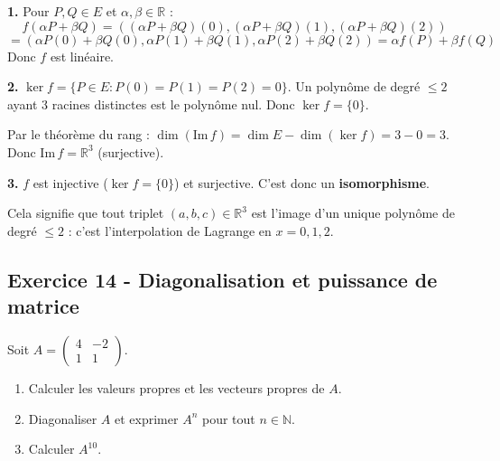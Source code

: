 \documentclass[12pt,a4paper]{article}
\begin{document}
\begin{boitecorrige}
\textbf{1.} Pour $P, Q \in E$ et $\alpha, \beta \in \mathbb{R}$ :
\[
f(\alpha P + \beta Q) = ((\alpha P+\beta Q)(0), (\alpha P+\beta Q)(1), (\alpha P+\beta Q)(2))
\]
\[
= (\alpha P(0)+\beta Q(0), \alpha P(1)+\beta Q(1), \alpha P(2)+\beta Q(2)) = \alpha f(P) + \beta f(Q)
\]
Donc $f$ est linéaire.

\textbf{2.} $\ker f = \{P\in E : P(0)=P(1)=P(2)=0\}$. Un polynôme de degré $\leq 2$ ayant 3 racines distinctes est le polynôme nul. Donc $\ker f = \{0\}$.

Par le théorème du rang : $\dim(\text{Im}\,f) = \dim E - \dim(\ker f) = 3 - 0 = 3$. Donc $\text{Im}\,f = \mathbb{R}^3$ (surjective).

\textbf{3.} $f$ est injective ($\ker f = \{0\}$) et surjective. C'est donc un \textbf{isomorphisme}.

Cela signifie que tout triplet $(a, b, c) \in \mathbb{R}^3$ est l'image d'un unique polynôme de degré $\leq 2$ : c'est l'interpolation de Lagrange en $x=0,1,2$.
\end{boitecorrige}

\subsection*{Exercice 14 - Diagonalisation et puissance de matrice \niveau{\difficile}}

\begin{boiteexercice}
Soit $A = \begin{pmatrix}4&-2\\1&1\end{pmatrix}$.
\begin{enumerate}
  \item Calculer les valeurs propres et les vecteurs propres de $A$.
  \item Diagonaliser $A$ et exprimer $A^n$ pour tout $n\in\mathbb{N}$.
  \item Calculer $A^{10}$.
\end{enumerate}
\end{boiteexercice}
\end{document}
